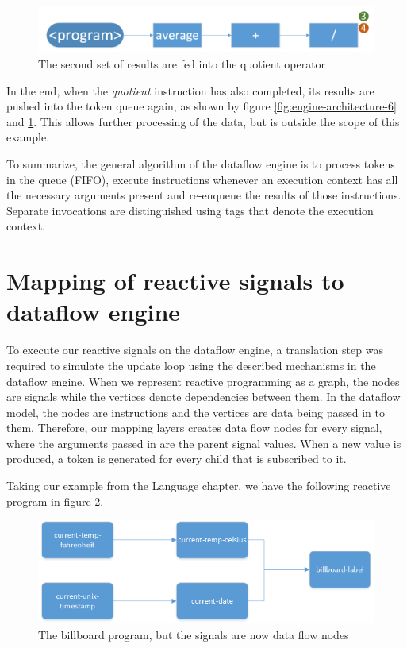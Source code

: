 \begin{figure}[h!]
	\includegraphics[width=\textwidth]{images/Engine-Architecture-7.png}
	\caption{The second set of results are fed into the quotient operator}
	\label{fig:engine-architecture-7}
\end{figure}

In the end, when the \textit{quotient} instruction has also completed, its results are pushed into the token queue again, as shown by figure \ref{fig:engine-architecture-6} and \ref{fig:engine-architecture-7}. This allows further processing of the data, but is outside the scope of this example. 

To summarize, the general algorithm of the dataflow engine is to process tokens in the queue (FIFO), execute instructions whenever an execution context has all the necessary arguments present and re-enqueue the results of those instructions. Separate invocations are distinguished using tags that denote the execution context.

\section{Mapping of reactive signals to dataflow engine}

To execute our reactive signals on the dataflow engine, a translation step was required to simulate the update loop using the described mechanisms in the dataflow engine.
When we represent reactive programming as a graph, the nodes are signals while the vertices denote dependencies between them.
In the dataflow model, the nodes are instructions and the vertices are data being passed in to them. Therefore, our mapping layers creates data flow nodes for every signal, where the arguments passed in are the parent signal values. When a new value is produced, a token is generated for every child that is subscribed to it.

Taking our example from the Language chapter, we have the following reactive program in figure \ref{fig:engine-mapping-1}.

\begin{figure}[h!]
	\includegraphics[width=\textwidth]{images/Engine-Mapping-1.png}
	\caption{The billboard program, but the signals are now data flow nodes}
	\label{fig:engine-mapping-1}
\end{figure}

